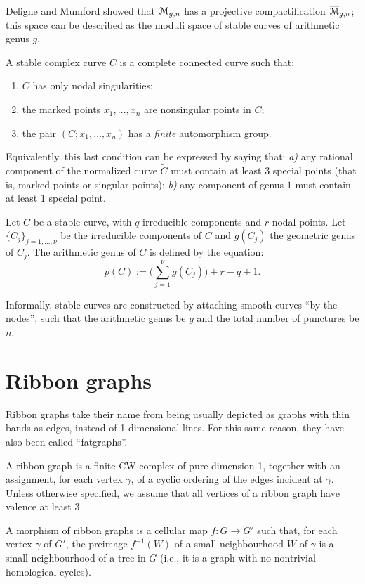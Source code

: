Deligne and Mumford \cite{deligne-mumford} showed that $\mathcal{M}_{g,n}$ has
a projective compactification $\overline{\mathcal{M}}_{g,n}$; this space can be
described as the moduli space of stable curves of arithmetic genus
$g$.
\begin{definition}
  A stable complex curve $C$ is a complete connected curve such that:
  \begin{enumerate}
  \item $C$ has only nodal singularities;
  \item the marked points $x_1, \ldots, x_n$ are nonsingular points in
    $C$;
  \item the pair $(C; x_1, \ldots, x_n)$ has a \emph{finite} automorphism
    group.
  \end{enumerate}
\end{definition}
Equivalently, this last condition can be expressed by saying that:
\textsl{a)} any rational component of the normalized curve $\tilde C$
must contain at least 3 special points (that is, marked points or
singular points); \textsl{b)} any component of genus $1$ must contain
at least 1 special point.

Let $C$ be a stable curve, with $q$ irreducible components and $r$
nodal points. Let $\{C_j\}_{j=1, \dots, \nu}$ be the irreducible
components of $C$ and $g(C_j)$ the geometric genus of $C_j$.  The
arithmetic genus of $C$ is defined by the equation:
\begin{equation*}
  p(C) := \bigl({\textstyle \sum_{j=1}^\nu} g(C_j) \bigr) + r - q + 1.
\end{equation*}

Informally, stable curves are constructed by attaching smooth curves
``by the nodes'', such that the arithmetic genus be $g$ and the total
number of punctures be $n$.



\section{Ribbon graphs}
\label{sec:ribbon-graphs}

Ribbon graphs take their name from being usually depicted as graphs
with thin bands as edges, instead of 1-dimensional lines.  For this
same reason, they have also been called ``fatgraphs''.

\begin{definition}
  \label{dfn:ribbon-graphs}
  A ribbon graph is a finite CW-complex of pure dimension 1, together
  with an assignment, for each vertex $\gamma$, of a cyclic ordering of the
  edges incident at $\gamma$.  Unless otherwise specified, we assume that
  all vertices of a ribbon graph have valence at least 3.

  A morphism of ribbon graphs is a cellular map $f:G\to G'$ such that,
  for each vertex $\gamma$ of $G'$, the preimage $f^{-1}(W)$ of a small
  neighbourhood $W$ of $\gamma$ is a small neighbourhood of a tree in $G$
  (i.e., it is a graph with no nontrivial homological cycles).
\end{definition}

